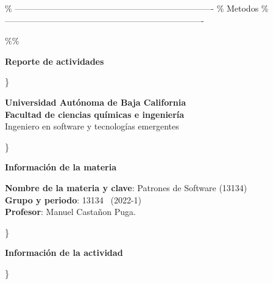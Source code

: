 \documentclass[11pt]{article}
\begin{document}
\newcommand{\university}{Universidad Autónoma de Baja California}
\newcommand{\facultad}{Facultad de ciencias químicas e ingeniería}
\newcommand{\program}{Ingeniero en software y tecnologías emergentes}
\newcommand{\subject}{Patrones de Software (13134)}
\newcommand{\group}{13134}
\newcommand{\period}{2022-1}
\newcommand{\docente}{Manuel Castañon Puga}

\% ----------------------------------------------------------------------
\%                             Metodos 
\% ----------------------------------------------------------------------



\newcommand{\datasection}[1]\{
  \universitytitle
  \pugacurso
  \%\% \vspace{12.5pt}
\begin{center}
  {\large\bfseries Reporte de actividades}
\end{center}
\}


\newcommand{\universitytitle}\{
\begin{center}
    \Large
    \textbf{\university \\ 
    \facultad} \\
    \vspace{0.25in}
    \large
    \program
    \vspace*{.25in}
\end{center}
\}

\newcommand{\pugacurso}\{
\begin{center}
  {\large\bfseries Información de la materia}
  \begin{mdframed}
    \textbf{Nombre de la materia y clave}: \subject \\
    \textbf{Grupo y periodo}: \group ~ (\period) \\
    \textbf{Profesor}: \docente.
  \end{mdframed}
\end{center}
\}

\newcommand{\pugaactividad}[1]\{
\begin{center}
  {\large\bfseries Información de la actividad}
\end{center}
\}
\end{document}
